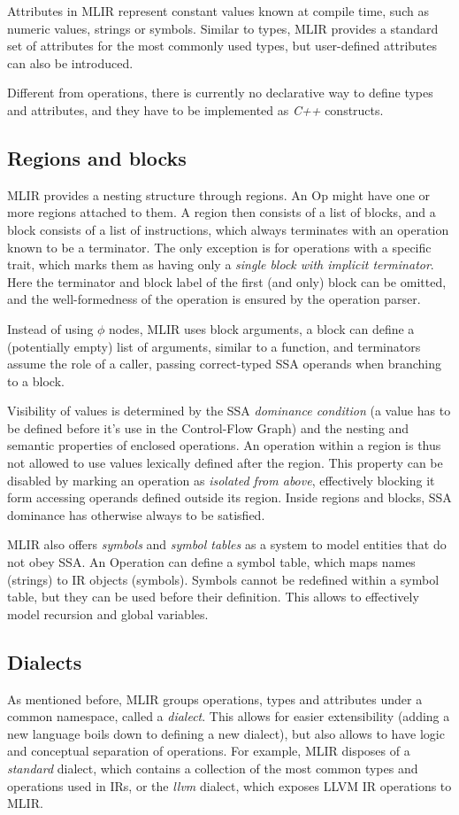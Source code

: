 Attributes in MLIR represent constant values known at compile time, such as numeric values, strings or symbols. Similar to types, MLIR provides a standard set of attributes for the most commonly used types, but user-defined attributes can also be introduced.

Different from operations, there is currently no declarative way to define types and attributes, and they have to be implemented as \textit{C++} constructs.

\subsection{Regions and blocks}
MLIR provides a nesting structure through regions. An Op might have one or more regions attached to them. A region then consists of a list of blocks, and a block consists of a list of instructions, which always terminates with an operation known to be a terminator. The only exception is for operations with a specific trait, which marks them as having only a \textit{single block with implicit terminator}. Here the terminator and block label of the first (and only) block can be omitted, and the well-formedness of the operation is ensured by the operation parser.

Instead of using $\phi$ nodes, MLIR uses block arguments, \ie a block can define a (potentially empty) list of arguments, similar to a function, and terminators assume the role of a caller, passing correct-typed SSA operands when branching to a block.

Visibility of values is determined by the SSA \textit{dominance condition} (\ie a value has to be defined before it's use in the Control-Flow Graph) and the nesting and semantic properties of enclosed operations. An operation within a region is thus not allowed to use values lexically defined after the region. This property can be disabled by marking an operation as \textit{isolated from above}, effectively blocking it form accessing operands defined outside its region. Inside regions and blocks, SSA dominance has otherwise always to be satisfied.

MLIR also offers \textit{symbols} and \textit{symbol tables} as a system to model entities that do not obey SSA. An Operation can define a symbol table, which maps names (strings) to IR objects (symbols). Symbols cannot be redefined within a symbol table, but they can be used before their definition. This allows to effectively model recursion and global variables.

\subsection{Dialects}
As mentioned before, MLIR groups operations, types and attributes under a common namespace, called a \textit{dialect}. This allows for easier extensibility (\ie adding a new language boils down to defining a new dialect), but also allows to have logic and conceptual separation of operations. For example, MLIR disposes of a \textit{standard} dialect, which contains a collection of the most common types and operations used in IRs, or the \textit{llvm} dialect, which exposes LLVM IR operations to MLIR.

